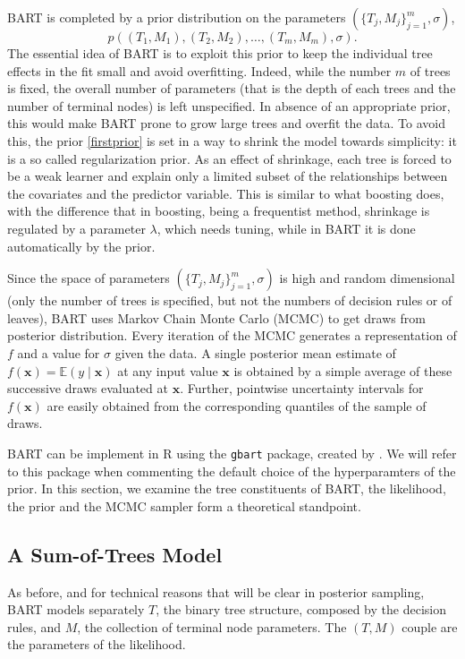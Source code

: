 \documentclass[a4paper,11pt]{article}
\begin{document}
BART is completed by a prior distribution on the parameters $ (\{T_j, M_j \}_{j=1}^m, \sigma)$, 
\begin{equation}
p((T_1, M_1), (T_2, M_2), \ldots, (T_m, M_m), \sigma). \label{firstprior}
\end{equation}
The essential idea of BART is to exploit this prior to keep the individual tree effects in the fit small and avoid overfitting. Indeed, while the number $m$ of trees is fixed, the overall number of parameters (that is the depth of each trees and the number of terminal nodes) is left unspecified. In absence of an appropriate prior, this would make BART prone to grow large trees and overfit the data. To avoid this, the prior \eqref{firstprior} is set in a way to shrink the model towards simplicity: it is a so called regularization prior. As an effect of shrinkage, each tree is forced to be a weak learner and explain only a limited subset of the relationships between the covariates and the predictor variable. This is similar to what boosting does, with the difference that in boosting, being a frequentist method, shrinkage is regulated by a parameter $\lambda$, which needs tuning, while in BART it is done automatically by the prior.

Since the space of parameters $ (\{T_j, M_j \}_{j=1}^m, \sigma)$ is high and random dimensional (only the number of trees is specified, but not the numbers of decision rules or of leaves), BART uses Markov Chain Monte Carlo (MCMC) to get draws from posterior distribution.  Every iteration of the MCMC generates a representation of $f$ and a value for $\sigma$ given the data. A single posterior mean estimate of \( f(\mathbf{x}) = \mathbb{E}(y \mid \mathbf{x}) \) at any input value $\mathbf{x}$ is obtained by a simple average of these successive draws evaluated at \( \mathbf{x} \). Further, pointwise uncertainty intervals for \( f(\mathbf{x}) \) are easily obtained from the corresponding quantiles of the sample of draws.

BART can be implement in R using the \texttt{gbart} package, created by \cite{chipmanBARTBayesianAdditive2010}. We will refer to this package when commenting the default choice of the hyperparamters of the prior.
In this section, we examine the tree constituents of BART, the likelihood, the prior and the MCMC sampler form a theoretical standpoint. 

\subsection{A Sum-of-Trees Model}
As before, and for technical reasons that will be clear in posterior sampling, BART models separately $T$, the binary tree structure, composed by the decision rules, and $M$, the collection of terminal node parameters. The $(T, M)$ couple are the parameters of the likelihood.  
\end{document}
